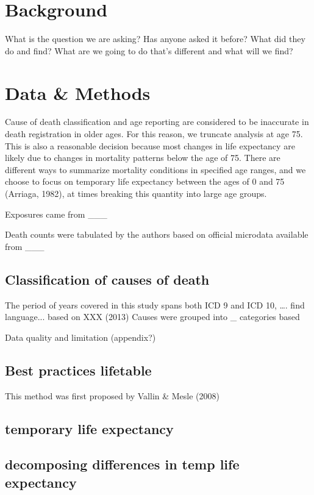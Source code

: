 \documentclass{article}
\begin{document}
\section{Background}
What is the question we are asking? Has anyone asked it before? What did they do
and find? What are we going to do that's different and what will we find?

\section{Data & Methods} 

Cause of death classification and age reporting are considered to be inaccurate in death registration in older ages. For this reason, we truncate analysis at age 75. This is also a reasonable decision because most changes in life expectancy are likely due to changes in mortality patterns below the age of 75. There are different ways to summarize mortality conditions in specified age ranges, and we choose to focus on temporary life expectancy between the ages of 0 and 75 (Arriaga, 1982), at times breaking this quantity into large age groups.

Exposures came from ___

Death counts were tabulated by the authors based on official microdata available from ___

\subsection{Classification of causes of death}
The period of years covered in this study spans both ICD 9 and ICD 10, …. find language... based on XXX (2013)
Causes were grouped into _ categories based 

Data quality and limitation (appendix?)

\subsection{Best practices lifetable}
This method was first proposed by Vallin \& Mesle (2008)


\subsection{temporary life expectancy}
\subsection{decomposing differences in temp life expectancy}
\end{document}

